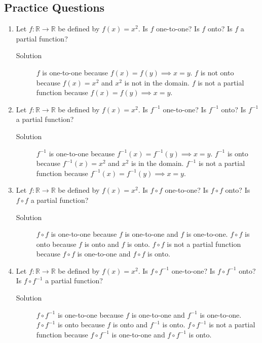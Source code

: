 \documentclass[11pt]{article}
\begin{document}
\subsection{Practice Questions}
\label{sec:orgc59fe15}
\begin{enumerate}
\item Let \(f: \mathbb{R} \rightarrow \mathbb{R}\) be defined by \(f(x) = x^2\). Is \(f\) one-to-one? Is \(f\) onto? Is \(f\) a partial function?
\begin{description}
\item[{Solution}] \(f\) is one-to-one because \(f(x) = f(y) \implies x = y\). \(f\) is not onto because \(f(x) = x^2\) and \(x^2\) is not in the domain. \(f\) is not a partial function because \(f(x) = f(y) \implies x = y\).
\end{description}
\item Let \(f: \mathbb{R} \rightarrow \mathbb{R}\) be defined by \(f(x) = x^2\). Is \(f^{-1}\) one-to-one? Is \(f^{-1}\) onto? Is \(f^{-1}\) a partial function?
\begin{description}
\item[{Solution}] \(f^{-1}\) is one-to-one because \(f^{-1}(x) = f^{-1}(y) \implies x = y\). \(f^{-1}\) is onto because \(f^{-1}(x) = x^2\) and \(x^2\) is in the domain. \(f^{-1}\) is not a partial function because \(f^{-1}(x) = f^{-1}(y) \implies x = y\).
\end{description}
\item Let \(f: \mathbb{R} \rightarrow \mathbb{R}\) be defined by \(f(x) = x^2\). Is \(f \circ f\) one-to-one? Is \(f \circ f\) onto? Is \(f \circ f\) a partial function?
\begin{description}
\item[{Solution}] \(f \circ f\) is one-to-one because \(f\) is one-to-one and \(f\) is one-to-one. \(f \circ f\) is onto because \(f\) is onto and \(f\) is onto. \(f \circ f\) is not a partial function because \(f \circ f\) is one-to-one and \(f \circ f\) is onto.
\end{description}
\item Let \(f: \mathbb{R} \rightarrow \mathbb{R}\) be defined by \(f(x) = x^2\). Is \(f \circ f^{-1}\) one-to-one? Is \(f \circ f^{-1}\) onto? Is \(f \circ f^{-1}\) a partial function?
\begin{description}
\item[{Solution}] \(f \circ f^{-1}\) is one-to-one because \(f\) is one-to-one and \(f^{-1}\) is one-to-one. \(f \circ f^{-1}\) is onto because \(f\) is onto and \(f^{-1}\) is onto. \(f \circ f^{-1}\) is not a partial function because \(f \circ f^{-1}\) is one-to-one and \(f \circ f^{-1}\) is onto.
\end{description}
\end{enumerate}
\end{document}
